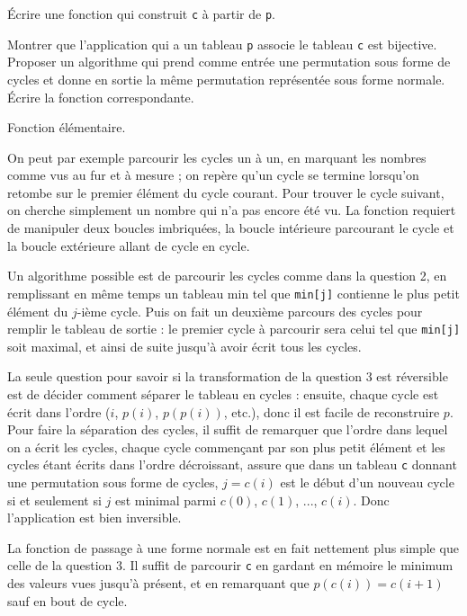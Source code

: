Écrire une fonction qui construit \texttt{c} à partir de \texttt{p}.

\Q
Montrer que l'application qui a un tableau \texttt{p} associe le tableau \texttt{c} est bijective. Proposer un algorithme qui prend comme entrée une permutation sous forme de cycles et donne en sortie la même permutation représentée sous forme normale. Écrire la fonction correspondante.

\Corrige

\Q
Fonction élémentaire.



\Q
On peut par exemple parcourir les cycles un à un, en marquant les nombres comme \og vus \fg{} au fur et à mesure ; on repère qu'un cycle se termine lorsqu'on retombe sur le premier élément du cycle courant. Pour trouver le cycle suivant, on cherche simplement un nombre qui n'a pas encore été vu. La fonction requiert de manipuler deux boucles imbriquées, la boucle intérieure parcourant le cycle et la boucle extérieure allant de cycle en cycle.



\Q
Un algorithme possible est de parcourir les cycles comme dans la question 2, en remplissant en même temps un tableau \og min \fg{} tel que \texttt{min[j]} contienne le plus petit élément du $j$-ième cycle. Puis on fait un deuxième parcours des cycles pour remplir le tableau de sortie : le premier cycle à parcourir sera celui tel que \texttt{min[j]} soit maximal, et ainsi de suite jusqu'à avoir écrit tous les cycles.



\Q
La seule question pour savoir si la transformation de la question 3 est réversible est de décider comment séparer le tableau en cycles : ensuite, chaque cycle est écrit dans l'ordre ($i$, $p(i)$, $p(p(i))$, etc.), donc il est facile de reconstruire $p$. Pour faire la séparation des cycles, il suffit de remarquer que l'ordre dans lequel on a écrit les cycles, chaque cycle commençant par son plus petit élément et les cycles étant écrits dans l'ordre décroissant, assure que dans un tableau \texttt{c} donnant une permutation sous forme de cycles, $j=c(i)$ est le début d'un nouveau cycle si et seulement si $j$ est minimal parmi $c(0)$, $c(1)$, ..., $c(i)$. Donc l'application est bien inversible.
\medskip

La fonction de passage à une forme normale est en fait nettement plus simple que celle de la question 3. Il suffit de parcourir \texttt{c} en gardant en mémoire le minimum des valeurs vues jusqu'à présent, et en remarquant que $p(c(i))=c(i+1)$ sauf en bout de cycle.



\Fin
